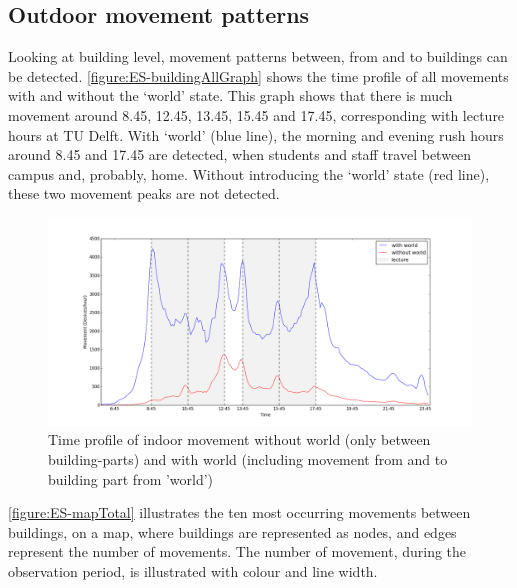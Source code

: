 \subsection{Outdoor movement patterns}\label{ES-outdoorMovement}
Looking at building level, movement patterns between, from and to buildings can be detected. \autoref{figure:ES-buildingAllGraph} shows the time profile of all movements with and without the ‘world’ state. This graph shows that there is much movement around 8.45, 12.45, 13.45, 15.45 and 17.45, corresponding with lecture hours at TU Delft. With ‘world’ (blue line), the morning and evening rush hours around 8.45 and 17.45 are detected, when students and staff travel between campus and, probably, home. Without introducing the ‘world’ state (red line), these two movement peaks are not detected. 

\begin{figure}[H]
\centering
\includegraphics[scale=0.3]{building_all_graph.png}
\captionsetup{justification=centering}
\caption{Time profile of indoor movement without world (only between building-parts) and with world (including movement from and to building part from 'world')}
\label{figure:ES-buildingAllGraph}
\end{figure}

\autoref{figure:ES-mapTotal} illustrates the ten most occurring movements between buildings, on a map, where buildings are represented as nodes, and edges represent the number of movements. The number of movement, during the observation period, is illustrated with colour and line width.

